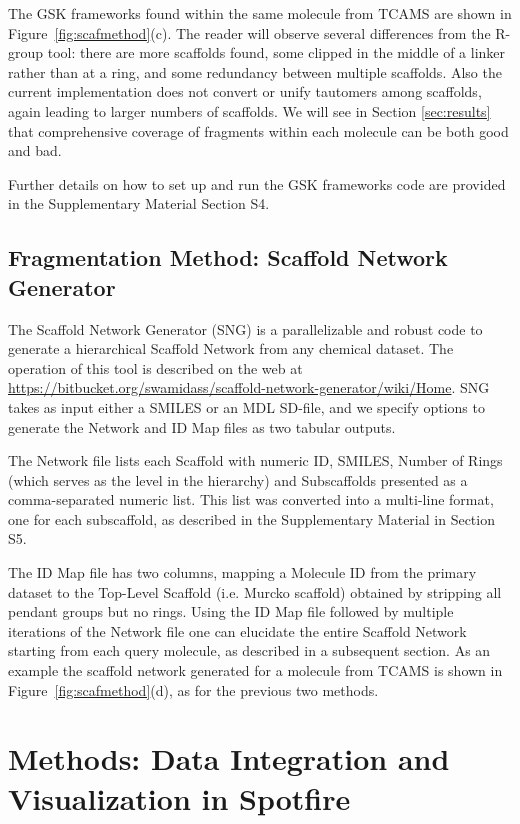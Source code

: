 \documentclass[journal=jacsat,manuscript=article]{achemso}
\newcommand*\fref[1]{Figure~\ref{fig:#1}}
\begin{document}
The GSK frameworks found within the same molecule from TCAMS are shown
in \fref{scafmethod}(c).  The reader will observe several differences
from the R-group tool: there are more scaffolds found, some clipped in
the middle of a linker rather than at a ring, and some redundancy
between multiple scaffolds. Also the current implementation does not
convert or unify tautomers among scaffolds, again leading to larger
numbers of scaffolds.  We will see in Section \ref{sec:results} that
comprehensive coverage of fragments within each molecule can be both
good and bad.

Further details on how to set up and run the GSK frameworks code are
provided in the Supplementary Material Section S4. %

\subsection{Fragmentation Method: Scaffold Network Generator}
\label{sec:SNG}
The Scaffold Network Generator (SNG) \cite{Matlock2013SNG} is a
parallelizable and robust code to generate a hierarchical Scaffold
Network from any chemical dataset. The operation of this tool is
described on the web at
\url{https://bitbucket.org/swamidass/scaffold-network-generator/wiki/Home}. SNG
takes as input either a SMILES or an MDL SD-file, and we specify
options to generate the Network and ID Map files as two tabular
outputs.

The Network file lists each Scaffold with numeric ID, SMILES, Number
of Rings (which serves as the level in the hierarchy) and Subscaffolds
presented as a comma-separated numeric list. This list was converted into
a multi-line format, one for each subscaffold, as described in the
Supplementary Material in Section S5.

The ID Map file has two columns, mapping a Molecule ID from the
primary dataset to the Top-Level Scaffold (i.e. Murcko scaffold)
obtained by stripping all pendant groups but no rings. Using the ID
Map file followed by multiple iterations of the Network file one can
elucidate the entire Scaffold Network starting from each query
molecule, as described in a subsequent section.  As an example the
scaffold network generated for a molecule from TCAMS is shown in
\fref{scafmethod}(d), as for the previous two methods.


\section{Methods: Data Integration and Visualization in Spotfire}
\label{sec:methods2}
\end{document}

